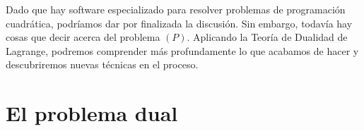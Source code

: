 \documentclass[11pt]{article}
\begin{document}
Dado que hay software especializado para resolver problemas de programación cuadrática, podríamos dar por finalizada la discusión. Sin embargo, todavía hay cosas que decir acerca del problema $(P)$. Aplicando la Teoría de Dualidad de Lagrange, podremos comprender más profundamente lo que acabamos de hacer y descubriremos nuevas técnicas en el proceso.

\section{El problema dual}
\end{document}

